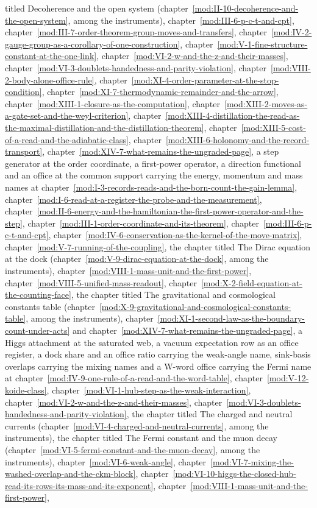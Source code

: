 \begin{chbridge}
titled Decoherence and the open system (chapter~\ref{mod:II-10-decoherence-and-the-open-system}, among the instruments), chapter~\ref{mod:III-6-p-c-t-and-cpt}, chapter~\ref{mod:III-7-order-theorem-group-moves-and-transfers}, chapter~\ref{mod:IV-2-gauge-group-as-a-corollary-of-one-construction}, chapter~\ref{mod:V-1-fine-structure-constant-at-the-one-link}, chapter~\ref{mod:VI-2-w-and-the-z-and-their-masses}, chapter~\ref{mod:VI-3-doublets-handedness-and-parity-violation}, chapter~\ref{mod:VIII-2-body-alone-office-rule}, chapter~\ref{mod:XI-4-order-parameter-at-the-stop-condition}, chapter~\ref{mod:XI-7-thermodynamic-remainder-and-the-arrow}, chapter~\ref{mod:XIII-1-closure-as-the-computation}, chapter~\ref{mod:XIII-2-moves-as-a-gate-set-and-the-weyl-criterion}, chapter~\ref{mod:XIII-4-distillation-the-read-as-the-maximal-distillation-and-the-distillation-theorem}, chapter~\ref{mod:XIII-5-cost-of-a-read-and-the-adiabatic-class}, chapter~\ref{mod:XIII-6-holonomy-and-the-record-transport}, chapter~\ref{mod:XIV-7-what-remains-the-ungraded-page}, a step generator at the order coordinate, a first-power operator, a direction functional and an office at the common support carrying the energy, momentum and mass names at chapter~\ref{mod:I-3-records-reads-and-the-born-count-the-gain-lemma}, chapter~\ref{mod:I-6-read-at-a-register-the-probe-and-the-measurement}, chapter~\ref{mod:II-6-energy-and-the-hamiltonian-the-first-power-operator-and-the-step}, chapter~\ref{mod:III-1-order-coordinate-and-its-theorem}, chapter~\ref{mod:III-6-p-c-t-and-cpt}, chapter~\ref{mod:IV-6-conservation-as-the-kernel-of-the-move-matrix}, chapter~\ref{mod:V-7-running-of-the-coupling}, the chapter titled The Dirac equation at the dock (chapter~\ref{mod:V-9-dirac-equation-at-the-dock}, among the instruments), chapter~\ref{mod:VIII-1-mass-unit-and-the-first-power}, chapter~\ref{mod:VIII-5-unified-mass-readout}, chapter~\ref{mod:X-2-field-equation-at-the-counting-face}, the chapter titled The gravitational and cosmological constants table (chapter~\ref{mod:X-9-gravitational-and-cosmological-constants-table}, among the instruments), chapter~\ref{mod:XI-1-second-law-as-the-boundary-count-under-acts} and chapter~\ref{mod:XIV-7-what-remains-the-ungraded-page}, a Higgs attachment at the saturated web, a vacuum expectation row as an office register, a dock share and an office ratio carrying the weak-angle name, sink-basis overlaps carrying the mixing names and a W-word office carrying the Fermi name at chapter~\ref{mod:IV-9-one-rule-of-a-read-and-the-word-table}, chapter~\ref{mod:V-12-koide-class}, chapter~\ref{mod:VI-1-hub-step-as-the-weak-interaction}, chapter~\ref{mod:VI-2-w-and-the-z-and-their-masses}, chapter~\ref{mod:VI-3-doublets-handedness-and-parity-violation}, the chapter titled The charged and neutral currents (chapter~\ref{mod:VI-4-charged-and-neutral-currents}, among the instruments), the chapter titled The Fermi constant and the muon decay (chapter~\ref{mod:VI-5-fermi-constant-and-the-muon-decay}, among the instruments), chapter~\ref{mod:VI-6-weak-angle}, chapter~\ref{mod:VI-7-mixing-the-washed-overlap-and-the-ckm-block}, chapter~\ref{mod:VI-10-higgs-the-closed-hub-read-its-rows-its-mass-and-its-exponent}, chapter~\ref{mod:VIII-1-mass-unit-and-the-first-power}, 
\end{chbridge}
